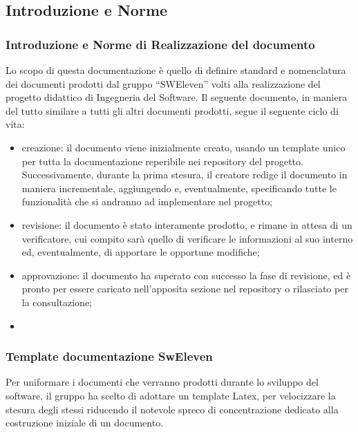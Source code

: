 \subsection{Introduzione e Norme}
\subsubsection{Introduzione e Norme di Realizzazione del documento}
Lo scopo di questa documentazione è quello di definire standard e nomenclatura dei documenti prodotti dal gruppo “SWEleven” volti alla realizzazione del progetto didattico di Ingegneria del Software.
Il seguente documento, in maniera del tutto similare a tutti gli altri documenti prodotti, segue il seguente ciclo di vita:
\begin{itemize}
\item creazione: il documento viene inizialmente creato, usando un template unico per tutta la documentazione reperibile nei repository del progetto. Successivamente, durante la prima stesura, il creatore redige il documento in maniera incrementale, aggiungendo e, eventualmente, specificando tutte le funzionalità che si andranno ad implementare nel progetto;
\item revisione: il documento è stato interamente prodotto, e rimane in attesa di un verificatore, cui compito sarà quello di verificare le informazioni al suo interno ed, eventualmente, di apportare le opportune modifiche;
\item approvazione: il documento ha superato con successo la fase di revisione, ed è pronto per essere caricato nell’apposita sezione nel repository o rilasciato per la consultazione;
\item
\end{itemize}
\subsubsection{Template documentazione SwEleven}
Per uniformare i documenti che verranno prodotti durante lo sviluppo del software, il gruppo ha scelto di adottare un template Latex, per velocizzare la stesura degli stessi riducendo il notevole spreco di concentrazione dedicato alla costruzione iniziale di un documento.
